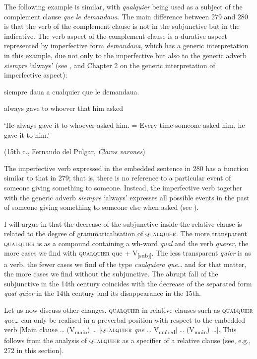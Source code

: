   The following example is similar, with \textit{qualquier} being used as a subject of the complement clause \textit{que le demandaua}. The main difference between 279 and 280 is that the verb of the complement clause is not in the subjunctive but in the indicative. The verb aspect of the complement clause is a durative aspect represented by imperfective form \textit{demandaua}, which has a generic interpretation in this example, due not only to the imperfective but also to the generic adverb \textit{siempre} ‘always’ (see \citealt{Quer2000}, and Chapter 2 on the generic interpretation of imperfective aspect):

  siempre   daua  a  cualquier  que  le  demandaua.

  always  gave  to  whoever  that  him  asked

  ‘He always gave it to whoever asked him. = Every time someone asked him, he gave it to him.’

  (15th c., Fernando del Pulgar, \textit{Claros varones})

The imperfective verb expressed in the embedded sentence in 280 has a function similar to that in 279; that is, there is no reference to a particular event of someone giving something to someone. Instead, the imperfective verb together with the generic adverb \textit{siempre} ‘always’ expresses all possible events in the past of someone giving something to someone else when asked (see \citealt{Becker2014}).

  I will argue in  that the decrease of the subjunctive inside the relative clause is related to the degree of grammaticalisation of \textsc{qualquier}. The more transparent \textsc{qualquier} is as a compound containing a wh-word \textit{qual} and the verb \textit{querer}, the more cases we find with \textsc{qualquier} que + V\textsubscript{[subj]}. The less transparent \textit{quier} is as a verb, the fewer cases we find of the type \textit{cualquiera que…} and for that matter, the more cases we find without the subjunctive. The abrupt fall of the subjunctive in the 14th century coincides with the decrease of the separated form \textit{qual quier} in the 14th century and its disappearance in the 15th.

  Let us now discuss other changes. \textsc{qualquier} in relative clauses such as \textsc{qualquier} \textit{que…} can only be realised in a preverbal position with respect to the embedded verb [Main clause … (V\textsubscript{main}) … [\textsc{qualquier} \textit{que} … V\textsubscript{embed}] … (V\textsubscript{main}) …]. This follows from the analysis of \textsc{qualquier} as a specifier of a relative clause (see, e.g., 272 in this section).

